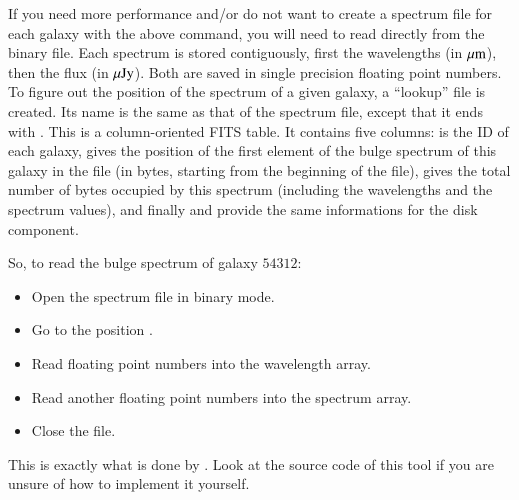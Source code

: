 If you need more performance and/or do not want to create a spectrum file for each galaxy with the above command, you will need to read directly from the binary file. Each spectrum is stored contiguously, first the wavelengths (in $\mu{\rm m}$), then the flux (in $\mu{\rm Jy}$). Both are saved in single precision floating point numbers. To figure out the position of the spectrum of a given galaxy, a ``lookup'' file is created. Its name is the same as that of the spectrum file, except that it ends with . This is a column-oriented FITS table. It contains five columns:  is the ID of each galaxy,  gives the position of the first element of the bulge spectrum of this galaxy in the file (in bytes, starting from the beginning of the file),  gives the total number of bytes occupied by this spectrum (including the wavelengths and the spectrum values), and finally  and  provide the same informations for the disk component.

So, to read the bulge spectrum of galaxy $54312$:
\begin{itemize}
\item Open the spectrum file in binary mode.
\item Go to the position .
\item Read  floating point numbers into the wavelength array.
\item Read another  floating point numbers into the spectrum array.
\item Close the file.
\end{itemize}
This is exactly what is done by . Look at the source code of this tool if you are unsure of how to implement it yourself.
